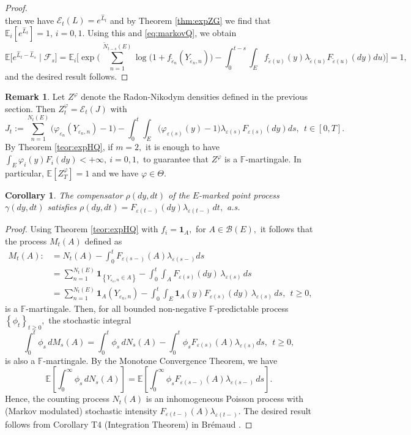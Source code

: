 \documentclass[11pt]{article}
\theoremstyle{plain}
\newtheorem{corollary}[theorem]{Corollary}
\theoremstyle{definition}
\newtheorem{remark}[theorem]{Remark}
\numberwithin{equation}{section}
\newcommand{\set}[1]{\left\{#1\right\}}
\newcommand{\eps}{\varepsilon}
\newcommand{\Exp}{\mathds{E}}
\newcommand{\B}{\mathcal{B}}
\newcommand{\Fil}{\mathds{F}}
\begin{document}
\begin{proof}
\begin{equation*}
\end{equation*}
then we have $\mathcal{E}_t(L)=e^{\hat{L}_t}$ and by Theorem \ref{thm:expZG} we find that $\Exp_i[e^{\hat{L}_t}]=1$, $i=0,1$. Using this and \eqref{eq:markovQ}, we obtain
\begin{equation*}
\Exp\bigl[e^{\hat{L}_t-\hat{L}_s}\mid\mathcal{F}_s\bigr]
=\Exp_i\Biggl[\exp\Biggl(\,\sum_{n=1}^{\widetilde{N}_{t-s}(E)}\log\bigl(1+f_{\tilde{\eps}_n}(Y_{\tilde{\eps}_n,n})\bigr)
-\int_0^{t-s}\int_{E}f_{\tilde{\eps}(u)}(y)\lambda_{\tilde{\eps}(u)}F_{\tilde{\eps}(u)}(dy)du\Biggr)\Biggr]= 1,
\end{equation*}
and the desired result follows.
\end{proof}

\begin{remark}\label{remZ:m2}
Let $Z^\varphi$ denote the Radon-Nikodym densities defined in the previous section. Then $Z_t^\varphi=\mathcal{E}_t(J)$ with
\begin{equation*}
J_t:=\sum_{n=1}^{N_t(E)}\bigl(\varphi_{\eps_n}(Y_{\eps_n,n})-1\bigr)
-\int_0^t\int_E\bigl(\varphi_{\eps(s)}(y)-1\bigr)\lambda_{\eps(s)}F_{\eps(s)}(dy)ds, \ \ t\in [0,T].
\end{equation*}
By Theorem \ref{teor:expHQ}, if $m=2,$ it is enough to have $\int_E\varphi_i(y)F_i(dy)<+\infty, \ i=0,1,$ to guarantee that $Z^\varphi$ is a $\Fil$-martingale. In particular, $\Exp[Z_T^\varphi]=1$ and we have $\varphi\in\Theta.$
\end{remark}

\begin{corollary}\label{lemrhodis}
The compensator $\rho(dy,dt)$ of the $E$-marked point process $\gamma(dy,dt)$ satisfies $\rho(dy,dt)=F_{\eps(t-)}(dy)\lambda_{\eps(t-)}\,dt,$ a.s.
\end{corollary}

\begin{proof}
Using Theorem \ref{teor:expHQ} with $f_i=\mathbf{1}_A,$ for $A\in\B(E),$ it follows that the process $M_t(A)$ defined as
\begin{align*}
 M_t(A):&=N_t(A)-\int_0^tF_{\eps(s-)}(A)\lambda_{\eps(s-)}ds\\
  &=\sum_{n=1}^{N_t(E)}\mathbf{1}_{\set{Y_{\eps_n,n}\in A}}-\int_0^t\int_A F_{\eps(s)}(dy)\,\lambda_{\eps(s)}\,ds\\
  &=\sum_{n=1}^{N_t(E)}\mathbf{1}_A(Y_{\eps_n,n})-\int_0^t\int_E\mathbf{1}_A(y)F_{\eps(s)}(dy)\,\lambda_{\eps(s)}\,ds, \ \ t\geq 0,
\end{align*}
is a $\Fil$-martingale. Then, for all bounded non-negative  $\Fil$-predictable process $\set{\phi_t}_{t\geq 0},$ the stochastic integral
\[
\int_0^t\phi_s\,dM_s(A)=\int_0^t\phi_s\,dN_s(A)-\int_0^t\phi_sF_{\eps(s)}(A)\lambda_{\eps(s)}ds, \ \ t\geq 0,
\]
is also a $\Fil$-martingale. By the Monotone Convergence Theorem, we have
\[
\Exp\left[\int_0^\infty\phi_s\,dN_s(A)\right]=\Exp\left[\int_0^\infty\phi_sF_{\eps(s-)}(A)\lambda_{\eps(s-)}\,ds\right].
\]
Hence, the counting process $N_t(A)$ is an inhomogeneous Poisson process with (Markov modulated) stochastic intensity  $F_{\eps(t-)}(A)\lambda_{\eps(t-)}.$ The desired result follows from Corollary T4 (Integration Theorem) in Br\'{e}maud \cite[Chapter VIII]{bremaud}.
\end{proof}
\end{document}
